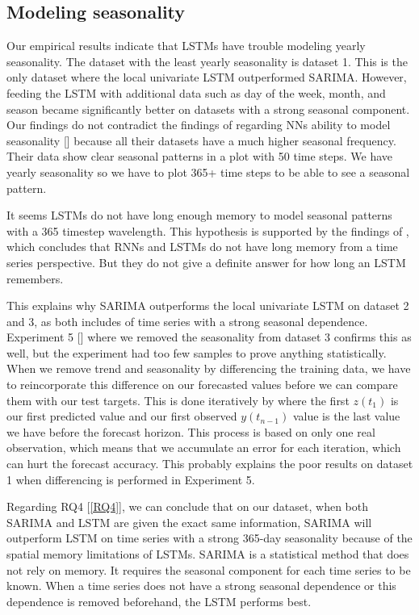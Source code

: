 
\subsection{Modeling seasonality}
Our empirical results indicate that LSTMs have trouble modeling yearly seasonality.
The dataset with the least yearly seasonality is dataset 1. This is the only dataset where
the local univariate LSTM outperformed SARIMA. However, feeding the LSTM with additional
data such as day of the week, month, and season became significantly better on datasets
with a strong seasonal component.
Our findings do not contradict the findings of \cite{Hewamalage2021} regarding NNs ability
to model seasonality []
because all their datasets have a much higher seasonal frequency. Their
data show clear seasonal patterns in a plot with 50 time steps. We have yearly seasonality
so we have to plot 365+ time steps to be able to see a seasonal pattern.

It seems LSTMs do not have long enough memory to model seasonal patterns
with a 365 timestep wavelength.
This hypothesis is supported by the findings of \cite{Zhao2020}, which concludes that
RNNs and LSTMs do not have long memory from a time series perspective.
But they do not give a definite answer for how long an LSTM remembers.

This explains why SARIMA outperforms the local univariate LSTM on dataset 2 and 3, as both includes
of time series with a strong seasonal dependence.
Experiment 5 [] where we removed
the seasonality from dataset 3 confirms this as well, but the experiment had too few samples
to prove anything statistically. When we remove trend and seasonality by differencing the training data,
we have to reincorporate this difference on our forecasted values before we can compare them with our
test targets. This is done iteratively by  where the first
$z(t_1)$ is our first predicted value and our first observed $y(t_{n-1})$ value is the last value
we have before the forecast horizon. This process is based on only one real observation, which means
that we accumulate an error for each iteration, which can hurt the forecast accuracy.
This probably explains the poor results on dataset 1 when differencing is performed in Experiment 5.

Regarding RQ4 [\ref{RQ4}], we can conclude that on our dataset, when
both SARIMA and LSTM are given the exact same information, SARIMA will outperform
LSTM on time series with a strong 365-day seasonality because of the spatial memory limitations
of LSTMs.
SARIMA is a statistical method that does not rely on memory.
It requires the seasonal component for each time series to be known.
When a time series does not have a strong seasonal dependence or this
dependence is removed beforehand, the LSTM performs best.

